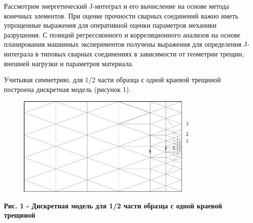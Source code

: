 Рассмотрим энергетический J-интеграл и его вычисление на основе метода
конечных элементов. При оценке прочности сварных соединений важно иметь
упрощенные выражения для оперативной оценки параметров механики
разрушения. С позиций регрессионного и корреляционного анализов на
основе планирования машинных экспериментов получены выражения для
определения J-интеграла в типовых сварных соединениях в зависимости от
геометрии трещин, внешней нагрузки и параметров материала.

Учитывая симметрию, для 1/2 части образца с одной краевой трещиной
построена дискретная модель (рисунок 1).

\begin{figure}[H]
	\centering
	\includegraphics[width=0.8\textwidth]{assets/1134}
	\caption*{}
\end{figure}

{\bfseries Рис. 1 - Дискретная модель для 1/2 части образца с одной краевой
трещиной}

